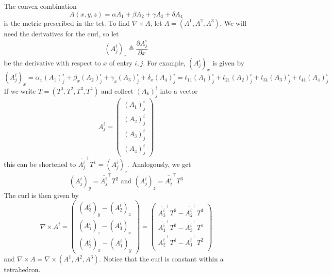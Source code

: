 \documentclass[../thesis.tex]{subfiles}
\begin{document}
The convex combination
$$A(x,y,z) = \alpha A_1 + \beta A_2 + \gamma A_3 + \delta A_4$$
is the metric prescribed in the tet. To find $\nabla \times A$, let
$A = (A^1, A^2, A^3)$. We will need the derivatives for the curl, so let
$$(A^i_j)_x \triangleq \frac{\partial A^i_j}{\partial x}$$ be the derivative with respect to $x$ of entry $i,j$.
For example, $(A^i_j)_x$ is given by
$$(A^i_j)_x = \alpha_x (A_1)^i_j + \beta_x (A_2)^i_j + \gamma_x (A_3)^i_j + \delta_x (A_4)^i_j = t_{11}(A_1)^i_j + t_{21}(A_2)^i_j + t_{31}(A_3)^i_j + t_{41}(A_4)^i_j$$
If we write $T= (T^1, T^2, T^3, T^4)$ and collect $(A_k)^i_j$ into a vector
$$\bar{A^i_j}=\begin{pmatrix}
  (A_1)^i_j \\ (A_2)^i_j \\ (A_3)^i_j \\ (A_4)^i_j
\end{pmatrix}$$
this can be shortened to $\bar{A^i_j}^{\top}T^1 = (A^i_j)_x$.
Analogously, we get
$$(A^i_j)_y = \bar{A^i_j}^{\top}T^2  \text{ and } (A^i_j)_z = \bar{A^i_j}^{\top}T^3$$
The curl is then given by
$$\nabla \times A^i = \begin{pmatrix}
  (A^i_3)_y - (A^i_2)_z \\
  (A^i_1)_z - (A^i_3)_x \\
  (A^i_2)_x - (A^i_1)_y
\end{pmatrix} =
\begin{pmatrix}
  \bar{A^i_3}^{\top}T^2 - \bar{A^i_2}^{\top}T^3\\
  \bar{A^i_1}^{\top}T^3 - \bar{A^i_3}^{\top}T^1\\
  \bar{A^i_2}^{\top}T^1 - \bar{A^i_1}^{\top}T^2\\
\end{pmatrix}$$
and $\nabla \times A = \nabla \times (A^1, A^2, A^3)$.
Notice that the curl is constant within a tetrahedron.
\end{document}
